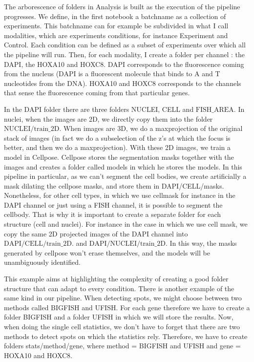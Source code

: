 \documentclass[24pt]{article}
\begin{document}
The arborescence of folders in Analysis is built as the execution of the pipeline progresses. We define, in the first notebook a batchname as a collection of experiments.  This batchname can for example be subdivided in what I call modalities, which are experiments conditions, for instance Experiment and Control. Each condition can be defined as a subset of experiments over which all the pipeline will run. Then, for each modality, I create a folder per channel : the DAPI, the HOXA10 and HOXC8. DAPI corresponds to the fluorescence coming from the nucleus (DAPI is a fluorescent molecule that binds to A and T nucleotides from the DNA). HOXA10 and HOXC8 corresponds to the channels that sense the fluorescence coming from that particular genes. 

In the DAPI folder there are three folders NUCLEI, CELL and $\text{FISH\_AREA}$. In nuclei, when the images are 2D, we directly copy them into the folder $\text{NUCLEI/train\_2D}$.  When images are 3D, we do a maxprojection of the original stack of images (in fact we do a subselection of the z’s at which the focus is better, and then we do a maxprojection). With these 2D images, we train a model in Cellpose. Cellpose stores the segmentation masks together with the images and creates a folder called models in which he stores the models.
In this pipeline in particular, as we can’t segment the cell bodies, we create artificially a mask dilating the cellpose masks, and store them in DAPI/CELL/masks. Nonetheless, for other cell types, in which we use cellmask for instance in the DAPI channel or just using a FISH channel, it is possible to segment the cellbody. That is why it is important to create a separate folder for each structure (cell and nuclei). For instance in the case in which we use cell mask, we copy the same 2D projected images of the DAPI channel into$\text{DAPI/CELL/train\_2D}$. and $\text{DAPI/NUCLEI/train\_2D}$.
In this way, the masks generated by cellpose won’t erase themselves, and the models will be unambiguously identified. 

This example aims at highlighting the complexity of creating a good folder structure that can adapt to every condition. There is another example of the same kind in our pipeline. When detecting spots, we might choose between two methods called BIGFISH and UFISH. For each gene therefore we have to create a folder  BIGFISH and a folder UFISH in which we will store the results. Now, when doing the single cell statistics, we don’t have to forget that there are two methods to detect spots on which the statistics rely. Therefore, we have to create folders stats/{method}/{gene}, where method = BIGFISH and UFISH and gene = HOXA10 and HOXC8.
\end{document}
